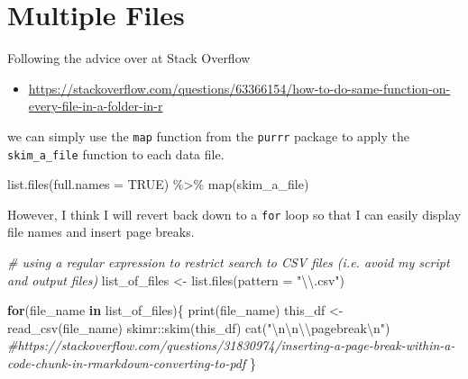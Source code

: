 \documentclass[
]{article}
\newenvironment{Shaded}{\begin{snugshade}}{\end{snugshade}}
\newcommand{\AttributeTok}[1]{\textcolor[rgb]{0.77,0.63,0.00}{#1}}
\newcommand{\CommentTok}[1]{\textcolor[rgb]{0.56,0.35,0.01}{\textit{#1}}}
\newcommand{\ConstantTok}[1]{\textcolor[rgb]{0.00,0.00,0.00}{#1}}
\newcommand{\ControlFlowTok}[1]{\textcolor[rgb]{0.13,0.29,0.53}{\textbf{#1}}}
\newcommand{\FunctionTok}[1]{\textcolor[rgb]{0.00,0.00,0.00}{#1}}
\newcommand{\NormalTok}[1]{#1}
\newcommand{\OtherTok}[1]{\textcolor[rgb]{0.56,0.35,0.01}{#1}}
\newcommand{\SpecialCharTok}[1]{\textcolor[rgb]{0.00,0.00,0.00}{#1}}
\newcommand{\StringTok}[1]{\textcolor[rgb]{0.31,0.60,0.02}{#1}}
\providecommand{\tightlist}{%
  \setlength{\itemsep}{0pt}\setlength{\parskip}{0pt}}
\begin{document}
\hypertarget{multiple-files}{%
\section{Multiple Files}\label{multiple-files}}

Following the advice over at Stack Overflow

\begin{itemize}
\tightlist
\item
  \url{https://stackoverflow.com/questions/63366154/how-to-do-same-function-on-every-file-in-a-folder-in-r}
\end{itemize}

we can simply use the \texttt{map} function from the \texttt{purrr}
package to apply the \texttt{skim\_a\_file} function to each data file.

\begin{Shaded}
\begin{Highlighting}[]
\FunctionTok{list.files}\NormalTok{(}\AttributeTok{full.names =} \ConstantTok{TRUE}\NormalTok{) }\SpecialCharTok{\%\textgreater{}\%}
  \FunctionTok{map}\NormalTok{(skim\_a\_file)}
\end{Highlighting}
\end{Shaded}

However, I think I will revert back down to a \texttt{for} loop so that
I can easily display file names and insert page breaks.

\begin{Shaded}
\begin{Highlighting}[]
\CommentTok{\# using a regular expression to restrict search to CSV files (i.e. avoid my script and output files)}
\NormalTok{list\_of\_files }\OtherTok{\textless{}{-}} \FunctionTok{list.files}\NormalTok{(}\AttributeTok{pattern =} \StringTok{"}\SpecialCharTok{\textbackslash{}\textbackslash{}}\StringTok{.csv"}\NormalTok{)}

\ControlFlowTok{for}\NormalTok{(file\_name }\ControlFlowTok{in}\NormalTok{ list\_of\_files)\{}
  \FunctionTok{print}\NormalTok{(file\_name)}
\NormalTok{  this\_df }\OtherTok{\textless{}{-}} \FunctionTok{read\_csv}\NormalTok{(file\_name)}
\NormalTok{  skimr}\SpecialCharTok{::}\FunctionTok{skim}\NormalTok{(this\_df)}
  \FunctionTok{cat}\NormalTok{(}\StringTok{"}\SpecialCharTok{\textbackslash{}n\textbackslash{}n\textbackslash{}\textbackslash{}}\StringTok{pagebreak}\SpecialCharTok{\textbackslash{}n}\StringTok{"}\NormalTok{) }\CommentTok{\#https://stackoverflow.com/questions/31830974/inserting{-}a{-}page{-}break{-}within{-}a{-}code{-}chunk{-}in{-}rmarkdown{-}converting{-}to{-}pdf}
\NormalTok{\}}
\end{Highlighting}
\end{Shaded}
\end{document}
